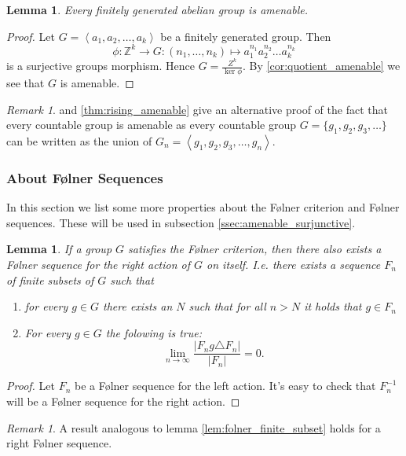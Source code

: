 \documentclass[titlepage, a4paper]{article}
\newcommand{\Z}{\mathbb{Z}}
\newcommand{\card}[1]{\left| #1 \right|}
\newtheorem{lemma}[theorem]{Lemma}
\theoremstyle{remark}
\newtheorem{remark}[theorem]{Remark}
\begin{document}
    \begin{lemma}\label{lem:fg_ab_amenable}
	    Every finitely generated abelian group is amenable.
    \end{lemma}
     \begin{proof}
	     Let $G = \left<a_1, a_2,\ldots, a_k \right>$ be a finitely generated group. Then \[
		     \phi: \Z^{k} \to G : (n_1, \ldots, n_k) \mapsto a_1^{n_1} a_2^{n_2} \ldots a_k^{n_k} 
	     \]
	     is a surjective groups morphism. Hence $G = \frac{Z^{k}}{\ker{\phi}}$. 
	     By \cref{cor:quotient_amenable} we see that $G$ is amenable.
	
    \end{proof}
    \begin{remark}
	     and \cref{thm:rising_amenable} give an alternative proof of the fact that every countable group is amenable as every countable group $G = \{g_1, g_2, g_3, \ldots\} $ can be written as the union of $G_n = \left<g_1, g_2, g_3, \ldots, g_n \right>$.
    \end{remark}


    \subsubsection{About Følner Sequences}  %

In this section we list some more properties about the Følner criterion and Følner sequences. These will be used in subsection \ref{ssec:amenable_surjunctive}.
\begin{lemma}\label{lem:right_folner_sequence}
	If a group $G$ satisfies the Følner criterion, then there also exists a Følner sequence for the right action of $G$ on itself. 
	I.e. there exists a sequence $F_n$ of finite subsets of $G$ such that 
		\begin{enumerate}
		\item for every $g \in G$ there exists an  $N$ such that for all $n >N$ it holds that $g \in F_n$ 
		\item For every $g \in G$ the folowing is true: \[
				\lim_{n \to \infty} \frac{\card{F_ng \triangle F_n}}{\card{F_n}} = 0
		.\] 
	\end{enumerate}
\end{lemma}
\begin{proof}
	Let $F_n$ be a Følner sequence for the left action. 
	It's easy to check that $F_n^{-1}$ will be a Følner sequence for the right action. 
\end{proof}
\begin{remark}
    A result analogous to lemma \ref{lem:folner_finite_subset} holds for a right Følner sequence.
\end{remark}
\end{document}
